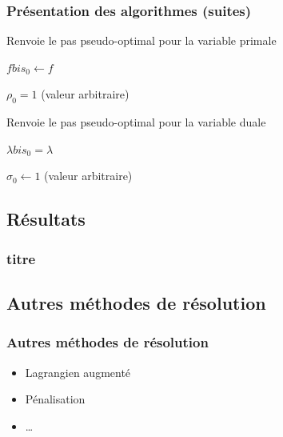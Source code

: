 \documentclass[11pt,envcountsect,aspectratio=169]{beamer} %
\newcommand{\R}{\mathbb{R}}
\begin{document}
\begin{frame}
    \frametitle{Présentation des algorithmes (suites)}
    
    \begin{algorithm}
    \caption{Renvoie le pas pseudo-optimal pour la variable primale}
    \label{algo:primale}

	    \KwIn{$f \in \R^n$ et $\lambda \in \R$}
	    

	    $fbis_0 \leftarrow f$

	    $\rho_0 = 1$ (valeur arbitraire)


    \end{algorithm}    
    
    \begin{algorithm}
	    \caption{Renvoie le pas pseudo-optimal pour la variable duale}
	    \label{algo:duale}
	
	    \KwIn{$f \in \R^n$ et $\lambda \in \R$}
	    
	    $\lambda bis_0 = \lambda$

	    $\sigma_0 \leftarrow 1$ (valeur arbitraire)

	
    \end{algorithm}
    
\end{frame}

\subsection{Résultats}

\begin{frame}
	\frametitle{titre}

	

\end{frame}





\subsection{Autres méthodes de résolution}

\begin{frame}
	\frametitle{Autres méthodes de résolution}

	\begin{itemize}
		\item Lagrangien augmenté
		\item Pénalisation
		\item \dots
	\end{itemize}

\end{frame}
\end{document}
